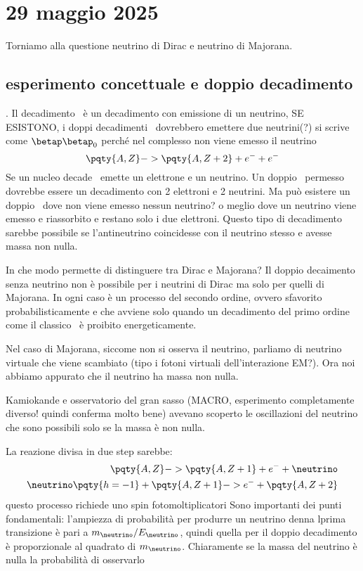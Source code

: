 
\section{29 maggio 2025}
Torniamo alla questione neutrino di Dirac e neutrino di Majorana.
\subsection{esperimento concettuale e doppio decadimento \betap}.
            Il decadimento \betap\ è un decadimento con emissione di un neutrino, SE ESISTONO, i doppi decadimenti \betap\ dovrebbero emettere due neutrini(?) si scrive come $\betap\betap_0$ perché nel complesso non viene emesso il neutrino
            \begin{equation}
                \pqty{A,Z} -> \pqty{A,Z+2} + e^- + e^-
            \end{equation}
            Se un nucleo decade \betap\ emette un elettrone e un neutrino. Un doppio \betap\ permesso dovrebbe essere un decadimento con 2 elettroni e 2 neutrini. Ma può esistere un doppio \betap\ dove non viene emesso nessun neutrino? o meglio dove un neutrino viene emesso e riassorbito e restano solo i due elettroni. Questo tipo di decadimento sarebbe possibile se l'antineutrino coincidesse con il neutrino stesso e avesse massa non nulla.

            In che modo permette di distinguere tra Dirac e Majorana? Il doppio decaimento senza neutrino non è possibile per i neutrini di Dirac ma solo per quelli di Majorana. In ogni caso è un processo del secondo ordine, ovvero sfavorito probabilisticamente e che avviene solo quando un decadimento del primo ordine come il classico \betap\ è proibito energeticamente.

            Nel caso di Majorana, siccome non si osserva il neutrino, parliamo di neutrino virtuale che viene scambiato (tipo i fotoni virtuali dell'interazione EM?). Ora noi abbiamo appurato che il neutrino ha massa non nulla.

            Kamiokande e osservatorio del gran sasso (MACRO, esperimento completamente diverso! quindi conferma molto bene) avevano scoperto le oscillazioni del neutrino che sono possibili solo se la massa è non nulla.
            
            La reazione divisa in due step sarebbe:
            \begin{align}
                \pqty{A,Z} -> \pqty{A,Z+1} + e^- + \neutrino \\
                \neutrino\pqty{h = -1} + \pqty{A,Z+1} -> e^- + \pqty{A,Z+2}
            \end{align}
            questo processo richiede uno spin fotomoltiplicatori
            Sono importanti dei punti fondamentali: l'ampiezza di probabilità per produrre un neutrino denna lprima transizione è pari a $m_\neutrino / E_\neutrino$, quindi quella per il doppio decadimento è proporzionale al quadrato di $m_\neutrino$. Chiaramente se la massa del neutrino è nulla la probabilità di osservarlo
            
